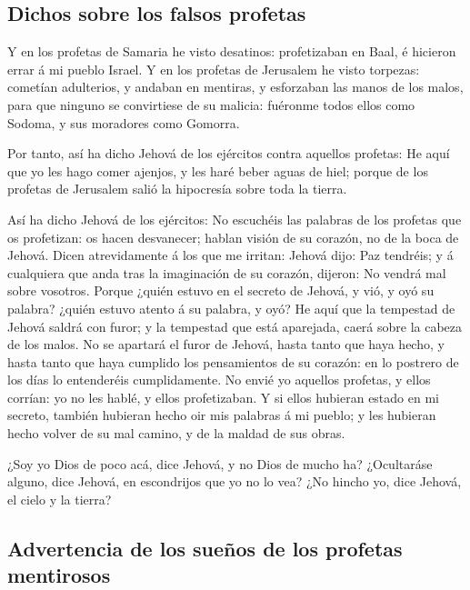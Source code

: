 \hypertarget{dichos-sobre-los-falsos-profetas}{%
\subsection{Dichos sobre los falsos
profetas}\label{dichos-sobre-los-falsos-profetas}}

 Y en los profetas de Samaria he visto desatinos:
profetizaban en Baal, é hicieron errar á mi pueblo Israel.
 Y en los profetas de Jerusalem he visto torpezas:
cometían adulterios, y andaban en mentiras, y esforzaban las manos de
los malos, para que ninguno se convirtiese de su malicia: fuéronme todos
ellos como Sodoma, y sus moradores como Gomorra.

 Por tanto, así ha dicho Jehová de los ejércitos contra
aquellos profetas: He aquí que yo les hago comer ajenjos, y les haré
beber aguas de hiel; porque de los profetas de Jerusalem salió la
hipocresía sobre toda la tierra.

 Así ha dicho Jehová de los ejércitos: No escuchéis las
palabras de los profetas que os profetizan: os hacen desvanecer; hablan
visión de su corazón, no de la boca de Jehová.  Dicen
atrevidamente á los que me irritan: Jehová dijo: Paz tendréis; y á
cualquiera que anda tras la imaginación de su corazón, dijeron: No
vendrá mal sobre vosotros.  Porque ¿quién estuvo en el
secreto de Jehová, y vió, y oyó su palabra? ¿quién estuvo atento á su
palabra, y oyó?  He aquí que la tempestad de Jehová
saldrá con furor; y la tempestad que está aparejada, caerá sobre la
cabeza de los malos.  No se apartará el furor de Jehová,
hasta tanto que haya hecho, y hasta tanto que haya cumplido los
pensamientos de su corazón: en lo postrero de los días lo entenderéis
cumplidamente.  No envié yo aquellos profetas, y ellos
corrían: yo no les hablé, y ellos profetizaban.  Y si
ellos hubieran estado en mi secreto, también hubieran hecho oir mis
palabras á mi pueblo; y les hubieran hecho volver de su mal camino, y de
la maldad de sus obras.

 ¿Soy yo Dios de poco acá, dice Jehová, y no Dios de
mucho ha?  ¿Ocultaráse alguno, dice Jehová, en
escondrijos que yo no lo vea? ¿No hincho yo, dice Jehová, el cielo y la
tierra?

\hypertarget{advertencia-de-los-sueuxf1os-de-los-profetas-mentirosos}{%
\subsection{Advertencia de los sueños de los profetas
mentirosos}\label{advertencia-de-los-sueuxf1os-de-los-profetas-mentirosos}}

